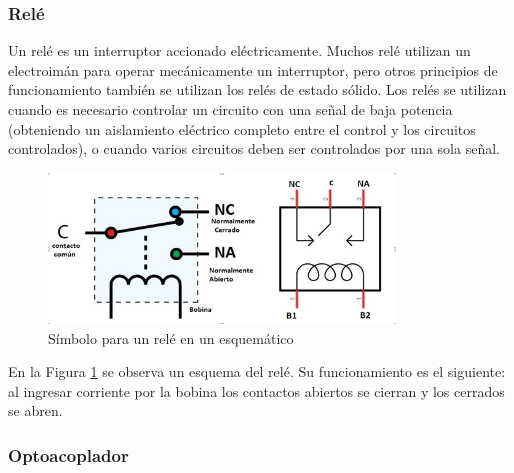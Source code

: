﻿\documentclass[a4paper]{article}
\begin{document}


\subsubsection*{Relé}

Un relé es un interruptor accionado eléctricamente. Muchos relé 
utilizan un electroimán para operar mecánicamente un interruptor, 
pero otros principios de funcionamiento también se utilizan los 
relés de estado sólido. Los relés se utilizan cuando es necesario 
controlar un circuito con una señal de baja potencia (obteniendo
un aislamiento eléctrico completo entre el control y los circuitos 
controlados), o cuando varios circuitos deben ser controlados por 
una sola señal.

\begin{figure}[h]\centering
    \includegraphics[height=4cm]{rele.png}
    \caption{Símbolo para un relé en un esquemático}
    \label{fig:Rele}
\end{figure}

En la Figura \ref{fig:Rele} se observa un esquema del relé. Su 
funcionamiento es el siguiente: al ingresar corriente por la bobina 
los contactos abiertos se cierran y los cerrados se abren.

\subsubsection*{Optoacoplador}
\end{document}
